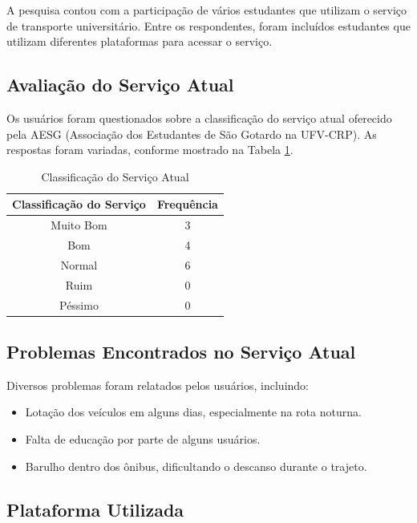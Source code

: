 \documentclass[
    12pt,                   %
    openright,              %
    oneside,                %
    a4paper,                %
    sumario=tradicional,    %
    english,                %
    brazil,                 %
    ]{abntex2}
\begin{document}
A pesquisa contou com a participação de vários estudantes que utilizam o serviço de transporte universitário. Entre os respondentes, foram incluídos estudantes que utilizam diferentes plataformas para acessar o serviço.

\subsection{Avaliação do Serviço Atual}

Os usuários foram questionados sobre a classificação do serviço atual oferecido pela AESG (Associação dos Estudantes de São Gotardo na UFV-CRP). As respostas foram variadas, conforme mostrado na Tabela \ref{tab:avaliacao-servico-atual}.

\begin{table}[htbp]
	\centering
	\caption{Classificação do Serviço Atual}
	\label{tab:avaliacao-servico-atual}
	\begin{tabular}{|c|c|}
		\hline
		\textbf{Classificação do Serviço} & \textbf{Frequência} \\
		\hline
		Muito Bom & 3 \\
		\hline
		Bom & 4 \\
		\hline
		Normal & 6 \\
		\hline
		Ruim & 0 \\
		\hline
		Péssimo & 0 \\
		\hline
	\end{tabular}
\end{table}


\subsection{Problemas Encontrados no Serviço Atual}

Diversos problemas foram relatados pelos usuários, incluindo:
\begin{itemize}
	\item Lotação dos veículos em alguns dias, especialmente na rota noturna.
	\item Falta de educação por parte de alguns usuários.
	\item Barulho dentro dos ônibus, dificultando o descanso durante o trajeto.
\end{itemize}


\subsection{Plataforma Utilizada}
\end{document}
